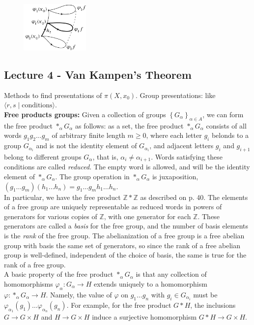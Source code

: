 \documentclass[a4paper]{article}
\begin{document}
\begin{figure}[H]
    \centering
    \includegraphics[width=0.3\textwidth]{lemma119-2.png}
    \label{fig:lemma119-2-png}
\end{figure}


\subsection*{Lecture 4 - Van Kampen's Theorem}

Methods to find presentations of $\pi \left( X, x_0 \right) $.
Group presentations: like $\langle r,s  \mid \text{conditions} \rangle$.\\
\linebreak
\textbf{Free products groups:} Given a collection of groups $\left\{ G_{\alpha}
\right\}_{\alpha \in A}$, we can form the free product
$\ast_{\alpha}G_{\alpha}$ as follows: as a set, the free product
$*_{\alpha}G_{\alpha}$ consists of all words $g_1 g_2 \ldots g_m$ of arbitrary
finite length $m\ge 0$, where each letter $g_i$ belonds to a group
$G_{\alpha_i}$ and is not the identity element of $G_{\alpha_{i}}$, and
adjacent letters $g_i$ and $g_{i+1}$ belong to different groups $G_{\alpha}$,
that is, $\alpha_i \neq \alpha_{i+1}$. Words satisfying these conditions are
called \textit{reduced}.
The empty word is allowed, and will be the identity element of 
$*_{\alpha}G_{\alpha}$. The group operation in $*_{\alpha}G_{\alpha}$ is
juxaposition,
$\left( g_1 \ldots g_m \right) \left( h_1 \ldots h_n \right) 
= g_1 \ldots g_m h_1 \ldots h_n$.\\
\linebreak
In particular, we have the free product $\mathbb{Z} * \mathbb{Z}$ as described
on p. 40. The elements of a free group are uniquely representable as reduced
words in powers of generators for various copies of $\mathbb{Z}$, with one
generator for each $\mathbb{Z}$. These generators are called a \textit{basis}
for the free group, and the number of basis elements is the \textit{rank} of
the free group. The abelianization of a free group is a free abelian group with
basis the same set of generators, so since the rank of a free abelian group is
well-defined, independent of the choice of basis, the same is true for the rank
of a free group.\\
\linebreak
A basic property of the free product $*_{\alpha}G_{\alpha}$ is that any
collection of homomorphisms $\varphi_{\alpha}  \colon G_{\alpha} \to H$ extends
uniquely to a homomorphism
$\varphi  \colon *_{\alpha}G_{\alpha} \to H$. Namely, the value of 
$\varphi$ on $g_1 \ldots g_n$ with $g_i \in G_{\alpha_i}$ must be
$\varphi_{\alpha_1} (g_1) \ldots \varphi_{\alpha_n} (g_n)$. For example,
for the free product $G*H$, the inclusions $G \to G \times H$ and 
$H \to G \times H$ induce a surjective homomorphism $G*H \to G \times H$.
\end{document}

